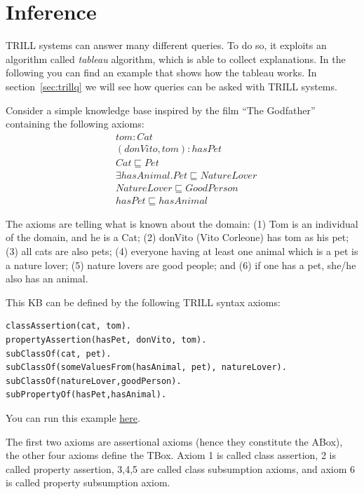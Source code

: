 \section{Inference}
\label{inf}

TRILL systems can answer many different queries. To do so, it exploits an algorithm called \emph{tableau} algorithm, which is able to collect explanations. In the following you can find an example that shows how the tableau works. In section~\ref{sec:trillq} we will see how queries can be asked with TRILL systems.

Consider a simple knowledge base inspired by the film ``The Godfather'' containing the following axioms:
\begin{align}
&tom : Cat\\
&(donVito, tom) : hasPet\\
&Cat \sqsubseteq Pet\\
&\exists hasAnimal.Pet \sqsubseteq NatureLover\\
&NatureLover \sqsubseteq GoodPerson\\
&hasPet \sqsubseteq hasAnimal
\end{align}

The axioms are telling what is known about the domain: (1) Tom is an individual of the domain, and he is a Cat; (2) donVito (Vito Corleone) has tom as his pet; (3) all cats are also pets; (4) everyone having at least one animal which is a pet is a nature lover; (5) nature lovers are good people; and (6) if one has a pet, she/he also has an animal.

This KB can be defined by the following TRILL syntax axioms:
\begin{verbatim}
classAssertion(cat, tom).
propertyAssertion(hasPet, donVito, tom).
subClassOf(cat, pet).
subClassOf(someValuesFrom(hasAnimal, pet), natureLover).
subClassOf(natureLover,goodPerson).
subPropertyOf(hasPet,hasAnimal).
\end{verbatim}
You can run this example \href{http://trill-sw.eu/example/trill/donVito.pl}{here}.

The first two axioms are assertional axioms (hence they constitute the ABox), the other four axioms define the TBox. Axiom 1 is called class assertion, 2 is called property assertion, 3,4,5 are called class subsumption axioms, and axiom 6 is called property subsumption axiom.

